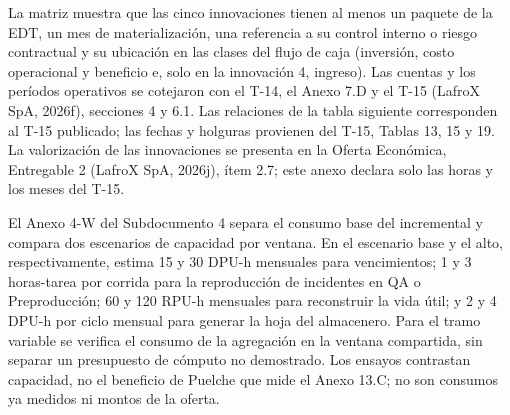 La matriz muestra que las cinco innovaciones tienen al menos un paquete de la EDT, un mes de materialización, una referencia a su control interno o riesgo contractual y su ubicación en las clases del flujo de caja (inversión, costo operacional y beneficio e, solo en la innovación 4, ingreso). Las cuentas y los períodos operativos se cotejaron con el T-14, el Anexo 7.D y el T-15 (LafroX SpA, 2026f), secciones 4 y 6.1. Las relaciones de la tabla siguiente corresponden al T-15 publicado; las fechas y holguras provienen del T-15, Tablas 13, 15 y 19. La valorización de las innovaciones se presenta en la Oferta Económica, Entregable 2 (LafroX SpA, 2026j), ítem 2.7; este anexo declara solo las horas y los meses del T-15.

El Anexo 4-W del Subdocumento 4 separa el consumo base del incremental y compara dos escenarios de capacidad por ventana. En el escenario base y el alto, respectivamente, estima 15 y 30 DPU-h mensuales para vencimientos; 1 y 3 horas-tarea por corrida para la reproducción de incidentes en QA o Preproducción; 60 y 120 RPU-h mensuales para reconstruir la vida útil; y 2 y 4 DPU-h por ciclo mensual para generar la hoja del almacenero. Para el tramo variable se verifica el consumo de la agregación en la ventana compartida, sin separar un presupuesto de cómputo no demostrado. Los ensayos contrastan capacidad, no el beneficio de Puelche que mide el Anexo 13.C; no son consumos ya medidos ni montos de la oferta.

